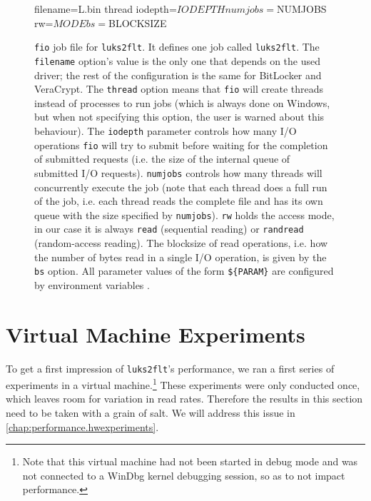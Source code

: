 \begin{figure}[htb!]
	\begin{inicode}
filename=L\:\random.bin
thread
iodepth=${IODEPTH}
numjobs=${NUMJOBS}
rw=${MODE}
bs=${BLOCKSIZE}
	\end{inicode}
	\caption[
		\texttt{fio} job file for \texttt{luks2flt}
	]{
		\texttt{fio} job file for \texttt{luks2flt}. It defines one job called \texttt{luks2flt}. The \texttt{filename} option's value is the only one that depends on the used driver; the rest of the configuration is the same for BitLocker and VeraCrypt. The \texttt{thread} option means that \texttt{fio} will create threads instead of processes to run jobs (which is always done on Windows, but when not specifying this option, the user is warned about this behaviour). The \texttt{iodepth} parameter controls how many I/O operations \texttt{fio} will try to submit before waiting for the completion of submitted requests (i.e. the size of the internal queue of submitted I/O requests). \texttt{numjobs} controls how many threads will concurrently execute the job (note that each thread does a full run of the job, i.e. each thread reads the complete file and has its own queue with the size specified by \texttt{numjobs}). \texttt{rw} holds the access mode, in our case it is always \texttt{read} (sequential reading) or \texttt{randread} (random-access reading). The blocksize of read operations, i.e. how the number of bytes read in a single I/O operation, is given by the \texttt{bs} option. All parameter values of the form \texttt{\$\{PARAM\}} are configured by environment variables \cite{Fio}.
	}
	\label{fig:performance.setup.fiojobfile}
\end{figure}


\section{Virtual Machine Experiments}
\label{chap:performance.vmexperiments}
To get a first impression of \texttt{luks2flt}'s performance, we ran a first series of experiments in a virtual machine.\footnote{\label{fn:performance.vmexperiments.vm} Note that this virtual machine had not been started in debug mode and was not connected to a WinDbg kernel debugging session, so as to not impact performance.} These experiments were only conducted once, which leaves room for variation in read rates. Therefore the results in this section need to be taken with a grain of salt. We will address this issue in \autoref{chap:performance.hwexperiments}.

